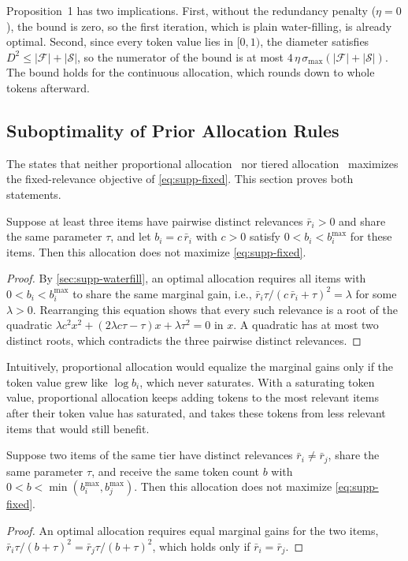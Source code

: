 \noindent Proposition~1 has two implications. First, without the redundancy penalty ($\eta=0$), the bound is zero, so the first iteration, which is plain water-filling, is already optimal. Second, since every token value lies in $[0,1)$, the diameter satisfies $D^2\le|\mathcal F|+|\mathcal S|$, so the numerator of the bound is at most $4\,\eta\,\sigma_{\max}(|\mathcal F|+|\mathcal S|)$. The bound holds for the continuous allocation, which \name rounds down to whole tokens afterward.

\subsection{Suboptimality of Prior Allocation Rules}
\label{sec:supp-prior}

The \mainpaper{} states that neither proportional allocation~\cite{luo2025quota} nor tiered allocation~\cite{zhang2025qframe} maximizes the fixed-relevance objective of \cref{eq:supp-fixed}. This section proves both statements.

\begin{lemma}
\label{lem:proportional}
Suppose at least three items have pairwise distinct relevances $\bar r_i>0$ and share the same parameter $\tau$, and let $b_i=c\,\bar r_i$ with $c>0$ satisfy $0<b_i<b_i^{\max}$ for these items. Then this allocation does not maximize \cref{eq:supp-fixed}.
\end{lemma}
\begin{proof}
By \cref{sec:supp-waterfill}, an optimal allocation requires all items with $0<b_i<b_i^{\max}$ to share the same marginal gain, i.e., $\bar r_i\tau/(c\,\bar r_i+\tau)^2=\lambda$ for some $\lambda>0$. Rearranging this equation shows that every such relevance is a root of the quadratic $\lambda c^2x^2+(2\lambda c\tau-\tau)x+\lambda\tau^2=0$ in $x$. A quadratic has at most two distinct roots, which contradicts the three pairwise distinct relevances.
\end{proof}

\noindent Intuitively, proportional allocation would equalize the marginal gains only if the token value grew like $\log b_i$, which never saturates. With a saturating token value, proportional allocation keeps adding tokens to the most relevant items after their token value has saturated, and takes these tokens from less relevant items that would still benefit.

\begin{lemma}
\label{lem:tiered}
Suppose two items of the same tier have distinct relevances $\bar r_i\ne\bar r_j$, share the same parameter $\tau$, and receive the same token count $b$ with $0<b<\min(b_i^{\max},b_j^{\max})$. Then this allocation does not maximize \cref{eq:supp-fixed}.
\end{lemma}
\begin{proof}
An optimal allocation requires equal marginal gains for the two items, $\bar r_i\tau/(b+\tau)^2=\bar r_j\tau/(b+\tau)^2$, which holds only if $\bar r_i=\bar r_j$.
\end{proof}

